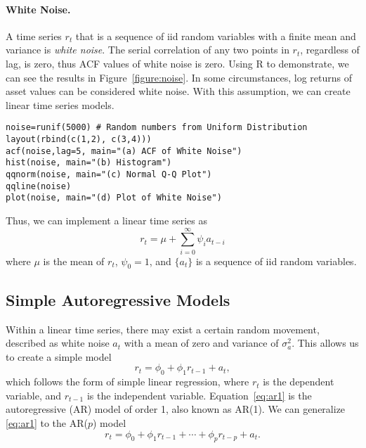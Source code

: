 \paragraph{White Noise.} A time series $r_t$ that is a sequence of iid random variables with a finite mean and variance is \emph{white noise}. The serial correlation of any two points in $r_t$, regardless of lag, is zero, thus ACF values of white noise is zero. Using R to demonstrate, we can see the results in Figure~\ref{figure:noise}. In some circumstances, log returns of asset values can be considered white noise. With this assumption, we can create linear time series models.
\begin{verbatim}
noise=runif(5000) # Random numbers from Uniform Distribution
layout(rbind(c(1,2), c(3,4)))
acf(noise,lag=5, main="(a) ACF of White Noise")
hist(noise, main="(b) Histogram")
qqnorm(noise, main="(c) Normal Q-Q Plot")
qqline(noise)
plot(noise, main="(d) Plot of White Noise")
\end{verbatim}

Thus, we can implement a linear time series as
\begin{equation}
r_t = \mu + \sum^{\infty}_{i=0} \psi_i a_{t-i}
\end{equation}
where $\mu$ is the mean of $r_t$, $\psi_0=1$, and $\{a_t\}$ is a sequence of iid random variables.

\subsection{Simple Autoregressive Models}
Within a linear time series, there may exist a certain random movement, described as white noise $a_t$ with a mean of zero and variance of $\sigma^2_a$. This allows us to create a simple model
\begin{equation}
r_t = \phi_0 +\phi_1 r_{t-1} + a_t,
\label{eq:ar1}
\end{equation}
which follows the form of simple linear regression, where $r_t$ is the dependent variable, and $r_{t-1}$ is the independent variable. Equation~\eqref{eq:ar1} is the autoregressive (AR) model of order 1, also known as AR(1). We can generalize \eqref{eq:ar1} to the AR($p$) model
\begin{equation}
r_t = \phi_0 +\phi_1 r_{t-1} + \cdots + \phi_p r_{t-p} + a_t.
\label{eq:arp}
\end{equation}

